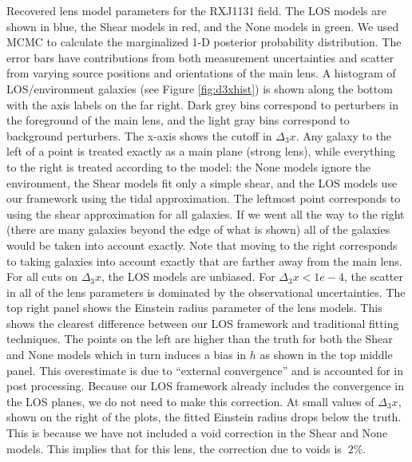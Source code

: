 \label{fig:RXJ1131} Recovered lens model parameters for the RXJ1131 field. The LOS models are shown in blue, the Shear models in red, and the None models in green. We used MCMC to calculate the marginalized 1-D posterior probability distribution. The error bars have contributions from both measurement uncertainties and scatter from varying source positions and orientations of the main lens. A histogram of LOS/environment galaxies (see Figure \ref{fig:d3xhist}) is shown along the bottom with the axis labels on the far right. Dark grey bins correspond to perturbers in the foreground of the main lens, and the light gray bins correspond to background perturbers. The x-axis shows the cutoff in $\Delta_3 x$. Any galaxy to the left of a point is treated exactly as a main plane (strong lens), while everything to the right is treated according to the model: the None models ignore the environment, the Shear models fit only a simple shear, and the LOS models use our framework using the tidal approximation. The leftmost point corresponds to using the shear approximation for all galaxies. If we went all the way to the right (there are many galaxies beyond the edge of what is shown) all of the galaxies would be taken into account exactly. Note that moving to the right corresponds to taking galaxies into account exactly that are farther away from the main lens. For all cuts on $\Delta_3 x$, the LOS models are unbiased. For $\Delta_3 x < 1e-4$, the scatter in all of the lens parameters is dominated by the observational uncertainties. The top right panel shows the Einstein radius parameter of the lens models. This shows the clearest difference between our LOS framework and traditional fitting techniques. The points on the left are higher than the truth for both the Shear and None models which in turn induces a bias in $h$ as shown in the top middle panel. This overestimate is due to ``external convergence'' and is accounted for in post processing. Because our LOS framework already includes the convergence in the LOS planes, we do not need to make this correction. At small values of $\Delta_3 x$, shown on the right of the plots, the fitted Einstein radius drops below the truth. This is because we have not included a void correction in the Shear and None models. This implies that for this lens, the correction due to voids is $~2\%$.
  
  
  